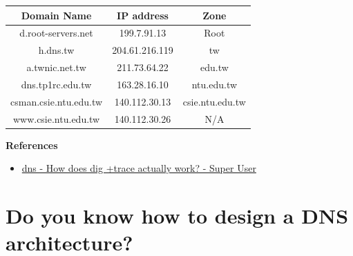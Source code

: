 \documentclass[12pt, a4paper]{article}
\begin{document}
  \begin{table}[H]
    \centering
    \begin{tabular}{|c|c|c|}
      \hline
      \textbf{Domain Name} & \textbf{IP address} & \textbf{Zone} \\\hline
      d.root-servers.net & 199.7.91.13 & Root \\
      h.dns.tw & 204.61.216.119 & tw \\
      a.twnic.net.tw & 211.73.64.22 & edu.tw \\
      dns.tp1rc.edu.tw & 163.28.16.10 & ntu.edu.tw \\
      csman.csie.ntu.edu.tw & 140.112.30.13 & csie.ntu.edu.tw \\
      www.csie.ntu.edu.tw & 140.112.30.26 & N/A \\\hline
    \end{tabular}
  \end{table}

  \textbf{References}
  \begin{itemize}
    \item \href{https://superuser.com/questions/715632/how-does-dig-trace-actually-work}{dns - How does dig +trace actually work? - Super User}
  \end{itemize}

  \pagebreak
  \section{Do you know how to design a DNS architecture?}
\end{document}
